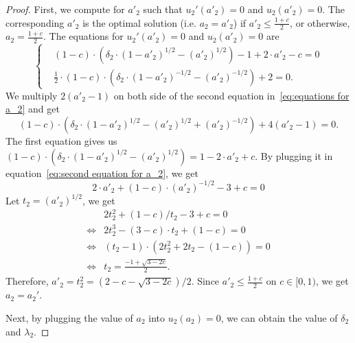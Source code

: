 \begin{proof}
First, we compute for $a'_2$ such that $u_2'(a'_2)=0$ and $u_2(a'_2)=0$. The corresponding $a'_2$ is the optimal solution (i.e. $a_2=a'_2$) if $a'_2\leq \frac{1+c}{2}$, or otherwise, $a_2=\frac{1+c}{2}$. The equations for $u_2'(a'_2)=0$ and $u_2(a'_2)=0$ are
\begin{equation}
\label{eq:equations for a_2}
\left\{
    \begin{aligned}
    &\left(1-c\right)\cdot\left(\delta_2\cdot(1-a'_2)^{1/2}-{(a'_2)}^{1/2}\right)-1+2\cdot a'_2-c=0\\
    &\frac{1}{2}\cdot\left(1-c\right)\cdot\left(\delta_2\cdot(1-a'_2)^{-1/2}-(a'_2)^{-1/2}\right)+2=0.
    \end{aligned}
    \right.
\end{equation}
We multiply $2(a'_2-1)$ on both side of the second equation in~\eqref{eq:equations for a_2} and get
\begin{equation}
\label{eq:second equation for a_2}
    \left(1-c\right)\cdot\left(\delta_2\cdot(1-a'_2)^{1/2}-(a'_2)^{1/2}+(a'_2)^{-1/2}\right)+4(a'_2-1)=0.
\end{equation}
The first equation gives us $(1-c)\cdot(\delta_2\cdot(1-a'_2)^{1/2}-(a'_2)^{1/2})=1-2\cdot a'_2+c$. By plugging it in equation~\eqref{eq:second equation for a_2}, we get
\begin{equation}
\label{eq:third equation for a_2}
    2\cdot a'_2+(1-c)\cdot (a'_2)^{-1/2}-3+c=0
\end{equation}
Let $t_2=(a'_2)^{1/2}$, we get
\begin{align*}
&2t_2^2+(1-c)/t_2-3+c=0\\
\Leftrightarrow& 2t_2^3-(3-c)\cdot t_2 +(1-c)=0\\
\Leftrightarrow& (t_2-1)\cdot\left(2t_2^2+2t_2-(1-c)\right)=0\\
\Leftrightarrow& t_2 = \frac{-1+\sqrt{3-2c}}{2}.
\end{align*}
Therefore, $a'_2=t_2^2=(2-c-\sqrt{3-2c})/2$. Since $a'_2\leq\frac{1+c}{2}$ on $c\in[0,1)$, we get $a_2=a_2'$.

Next, by plugging the value of $a_2$ into $u_2(a_2)=0$, we can obtain the value of $\delta_2$ and $\lambda_2$. 


\end{proof}
